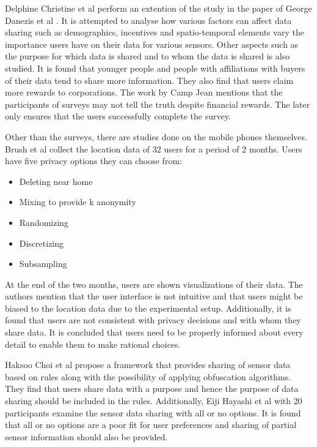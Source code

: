 Delphine Christine et al \cite{christin2013s} perform an extention of the study in the paper of George Danezis et al \cite{danezis2005much}. It is attempted to analyse how various factors can affect data sharing such as demographics, incentives and spatio-temporal elements vary the importance users have on their data for various sensors. Other aspects such as the purpose for which data is shared and to whom the data is shared is also studied. It is found that younger people and people with affiliations with buyers of their data tend to share more information. They also find that users claim more rewards to corporations. The work by Camp Jean \cite{camp2005state} mentions that the participants of surveys may not tell the truth despite financial rewards. The later only ensures that the users successfully complete the survey.

Other than the surveys, there are studies done on the mobile phones themselves. Brush et al \cite{brush2010exploring} collect the location data of 32 users for a period of 2 months. Users have five privacy options they can choose from:

\begin{itemize}
\item Deleting near home
\item Mixing to provide k anonymity
\item Randomizing
\item Discretizing
\item Subsampling
\end{itemize}

At the end of the two months, users are shown visualizations of their data. The authors mention that the user interface is not intuitive and that users might be biased to the location data due to the experimental setup. Additionally, it is found that users are not consistent with privacy decisions and with whom they share data. It is concluded that users need to be properly informed about every detail to enable them to make rational choices.

Haksoo Choi et al \cite{choi2011sensorsafe} propose a framework that provides sharing of sensor data based on rules along with the possibility of applying obfuscation algorithms. They find that users share data with a purpose and hence the purpose of data sharing should be included in the rules. Additionally, Eiji Hayashi et al \cite{hayashi2012goldilocks} with 20 participants examine the sensor data sharing with all or no options. It is found that all or no options are a poor fit for user preferences and sharing of partial sensor information should also be provided.

